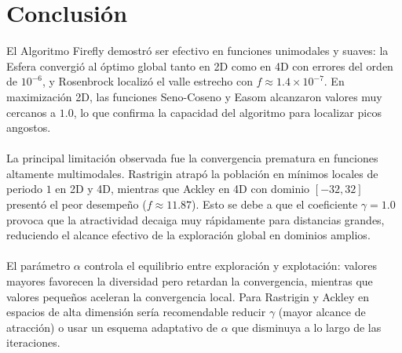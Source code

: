 \documentclass[11pt]{article}
\begin{document}
\section{Conclusi\'on}

El Algoritmo Firefly demostr\'o ser efectivo en funciones unimodales y suaves: la Esfera convergi\'o al \'optimo global tanto en 2D como en 4D con errores del orden de $10^{-6}$, y Rosenbrock localiz\'o el valle estrecho con $f \approx 1.4\times10^{-7}$. En maximizaci\'on 2D, las funciones Seno-Coseno y Easom alcanzaron valores muy cercanos a $1.0$, lo que confirma la capacidad del algoritmo para localizar picos angostos.\\\\
La principal limitaci\'on observada fue la convergencia prematura en funciones altamente multimodales. Rastrigin atrap\'o la poblaci\'on en m\'inimos locales de periodo $1$ en 2D y 4D, mientras que Ackley en 4D con dominio $[-32,32]$ present\'o el peor desempe\~no ($f \approx 11.87$). Esto se debe a que el coeficiente $\gamma = 1.0$ provoca que la atractividad decaiga muy r\'apidamente para distancias grandes, reduciendo el alcance efectivo de la exploraci\'on global en dominios amplios.\\\\
El par\'ametro $\alpha$ controla el equilibrio entre exploraci\'on y explotaci\'on: valores mayores favorecen la diversidad pero retardan la convergencia, mientras que valores peque\~nos aceleran la convergencia local. Para Rastrigin y Ackley en espacios de alta dimensi\'on ser\'ia recomendable reducir $\gamma$ (mayor alcance de atracci\'on) o usar un esquema adaptativo de $\alpha$ que disminuya a lo largo de las iteraciones.
\end{document}
